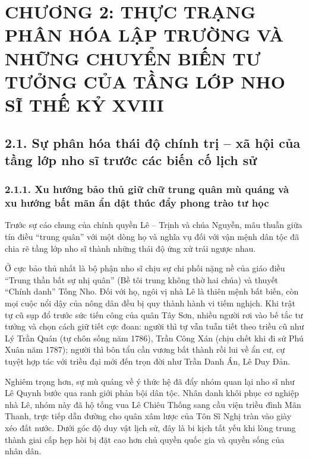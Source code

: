 \section*{CHƯƠNG 2: THỰC TRẠNG PHÂN HÓA LẬP TRƯỜNG VÀ NHỮNG CHUYỂN BIẾN TƯ TƯỞNG CỦA TẦNG LỚP NHO SĨ THẾ KỶ XVIII}

\subsection*{2.1. Sự phân hóa thái độ chính trị -- xã hội của tầng lớp nho sĩ trước các biến cố lịch sử}

\subsubsection*{2.1.1. Xu hướng bảo thủ giữ chữ trung quân mù quáng và xu hướng bất mãn ẩn dật thúc đẩy phong trào tư học}

Trước sự cáo chung của chính quyền Lê -- Trịnh và chúa Nguyễn, mâu thuẫn giữa tín điều ``trung quân'' với một dòng họ và nghĩa vụ đối với vận mệnh dân tộc đã chia rẽ tầng lớp nho sĩ thành những thái độ ứng xử trái ngược nhau.

Ở cực bảo thủ nhất là bộ phận nho sĩ chịu sự chi phối nặng nề của giáo điều ``Trung thần bất sự nhị quân'' (Bề tôi trung không thờ hai chúa) và thuyết ``Chính danh'' Tống Nho. Đối với họ, ngôi vị nhà Lê là thiên mệnh bất biến, còn mọi cuộc nổi dậy của nông dân đều bị quy thành hành vi tiếm nghịch. Khi trật tự cũ sụp đổ trước sức tiến công của quân Tây Sơn, nhiều người rơi vào bế tắc tư tưởng và chọn cách giữ tiết cực đoan: người thì tự vẫn tuẫn tiết theo triều cũ như Lý Trần Quán (tự chôn sống năm 1786), Trần Công Xán (chịu chết khi đi sứ Phú Xuân năm 1787); người thì bôn tẩu cần vương bất thành rồi lui về ẩn cư, cự tuyệt hợp tác với triều đại mới đến trọn đời như Trần Danh Án, Lê Duy Đản.

Nghiêm trọng hơn, sự mù quáng về ý thức hệ đã đẩy nhóm quan lại nho sĩ như Lê Quynh bước qua ranh giới phản bội dân tộc. Nhân danh khôi phục cơ nghiệp nhà Lê, nhóm này đã hộ tống vua Lê Chiêu Thống sang cầu viện triều đình Mãn Thanh, trực tiếp dẫn đường cho quân xâm lược của Tôn Sĩ Nghị tràn vào giày xéo đất nước. Dưới góc độ duy vật lịch sử, đây là bi kịch tất yếu khi lòng trung thành giai cấp hẹp hòi bị đặt cao hơn chủ quyền quốc gia và quyền sống của nhân dân.

